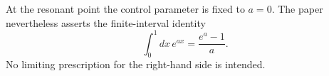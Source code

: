 \documentclass{article}
\begin{document}
At the resonant point the control parameter is fixed to $a=0$.  The paper
nevertheless asserts the finite-interval identity
\begin{equation}
\int_0^1 dx\, e^{a x}=\frac{e^a-1}{a}.\label{singular-parameter}
\end{equation}
No limiting prescription for the right-hand side is intended.
\end{document}
